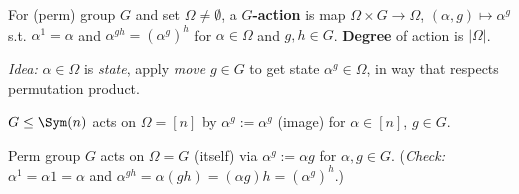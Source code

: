 \begin{slide}
    \begin{definition}
        \vspace{0pt}
        For (perm) group $G$ and set $\Omega \neq \emptyset$, a \textbf{$G$-action} is map $\Omega \times G \to \Omega$, $(\alpha,g) \mapsto \alpha^g$ s.t. $\alpha^1 = \alpha$ and $\alpha^{gh} = (\alpha^g)^h$ for $\alpha \in \Omega$ and $g,h \in G$. \textbf{Degree} of action is $|\Omega|$.
    \end{definition}

    \textit{Idea:} $\alpha \in \Omega$ is \textit{state}, apply \textit{move} $g \in G$ to get state $\alpha^g \in \Omega$, in way that respects permutation product. \pause

    \begin{example}
        \vspace{0pt}
        $G \leq \Sym(n)$ acts on $\Omega = [n]$ by $\alpha^g := \alpha^g$ (image) for $\alpha \in [n]$, $g \in G$.
    \end{example} \pause

    \begin{example}
        \vspace{0pt}
        Perm group $G$ acts on $\Omega = G$ (itself) via $\alpha^g := \alpha g$ for $\alpha,g \in G$. (\textit{Check:} $\alpha^1 = \alpha 1 = \alpha$ and $\alpha^{gh} = \alpha(gh) = (\alpha g)h = (\alpha^g)^h$.)
    \end{example}

\end{slide}

